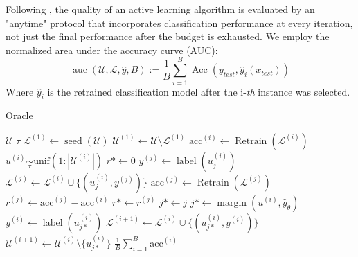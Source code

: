 \documentclass[]{article}
\begin{document}
%
Following \cite{zhou2021towards}, the quality of an active learning algorithm is evaluated by an "anytime" protocol that incorporates classification performance at every iteration, not just the final performance after the budget is exhausted.
We employ the normalized area under the accuracy curve (AUC):
\begin{equation}\label{eq:auc}
	\operatorname{auc}(\mathcal{U}, \mathcal{L}, \hat y, B) := \frac{1}{B} \sum_{i=1}^{B} \operatorname{Acc}(y_{test}, \hat y_i(x_{test}))
\end{equation}
Where $\hat y_i$ is the retrained classification model after the i-\textit{th} instance was selected.

\begin{minipage}{0.49\linewidth}
	\begin{algorithm}[H]
		\caption{Oracle}\label{alg:oracle}
		\begin{algorithmic}[1]
			\Require $\mathcal{U}$ 
			\Require $\tau$ 
			\State $\mathcal{L}^{(1)} \gets \operatorname{seed}(\mathcal{U})$  %
			\State $\mathcal{U}^{(1)} \gets \mathcal{U} \setminus \mathcal{L}^{(1)}$
			\State $\text{acc}^{(i)} \gets \operatorname{Retrain}(\mathcal{L}^{(i)})$  %
			\State $u^{(i)} \underset{\tau}{\sim} \text{unif}(1:|\mathcal{U}^{(i)}|)$
			\State $r* \gets 0$
			\State $y^{(j)} \gets \operatorname{label}(u^{(i)}_{j})$
			\State $\mathcal{L}^{(j)} \gets \mathcal{L}^{(i)} \cup \{(u^{(i)}_j, y^{(j)})\}$
			\State $\text{acc}^{(j)} \gets \operatorname{Retrain}(\mathcal{L}^{(j)})$  
			\State $r^{(j)} \gets \text{acc}^{(j)} - \text{acc}^{(i)}$
			\State $r* \gets r^{(j)}$
			\State $j* \gets j$
			\EndIf  
			\EndFor
			\State $j* \gets \operatorname{margin}(u^{(i)}, \hat y_\theta)$
			\EndIf
			\State $y^{(i)} \gets \operatorname{label}(u^{(i)}_{j*})$
			\State $\mathcal{L}^{(i+1)} \gets \mathcal{L}^{(i)} \cup \{(u^{(i)}_{j*}, y^{(i)})\}$
			\State $\mathcal{U}^{(i+1)} \gets \mathcal{U}^{(i)} \setminus \{u^{(i)}_{j*}\}$
			\EndFor
			\State
			\Return $\frac{1}{B} \sum_{i=1}^{B} \text{acc}^{(i)}$
		\end{algorithmic}
	\end{algorithm}
\end{minipage}
\end{document}
